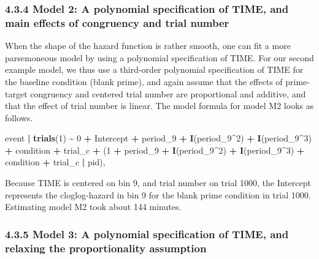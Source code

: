 \documentclass[
  man,floatsintext]{apa6}
\newenvironment{Shaded}{\begin{snugshade}}{\end{snugshade}}
\newcommand{\DecValTok}[1]{\textcolor[rgb]{0.00,0.00,0.81}{#1}}
\newcommand{\FunctionTok}[1]{\textcolor[rgb]{0.13,0.29,0.53}{\textbf{#1}}}
\newcommand{\NormalTok}[1]{#1}
\newcommand{\SpecialCharTok}[1]{\textcolor[rgb]{0.81,0.36,0.00}{\textbf{#1}}}
\begin{document}
\subsubsection{4.3.4 Model 2: A polynomial specification of TIME, and main effects of congruency and trial number}\label{model-2-a-polynomial-specification-of-time-and-main-effects-of-congruency-and-trial-number}

When the shape of the hazard function is rather smooth, one can fit a more parsemoneous model by using a polynomial specification of TIME. For our second example model, we thus use a third-order polynomial specification of TIME for the baseline condition (blank prime), and again assume that the effects of prime-target congruency and centered trial number are proportional and additive, and that the effect of trial number is linear. The model formula for model M2 looks as follows.

\scriptsize

\begin{Shaded}
\begin{Highlighting}[]
\NormalTok{event }\SpecialCharTok{|} \FunctionTok{trials}\NormalTok{(}\DecValTok{1}\NormalTok{) }\SpecialCharTok{\textasciitilde{}} \DecValTok{0} \SpecialCharTok{+}\NormalTok{ Intercept }\SpecialCharTok{+}\NormalTok{ period\_9 }\SpecialCharTok{+} \FunctionTok{I}\NormalTok{(period\_9}\SpecialCharTok{\^{}}\DecValTok{2}\NormalTok{) }\SpecialCharTok{+} \FunctionTok{I}\NormalTok{(period\_9}\SpecialCharTok{\^{}}\DecValTok{3}\NormalTok{) }\SpecialCharTok{+}
\NormalTok{                           condition }\SpecialCharTok{+}\NormalTok{ trial\_c }\SpecialCharTok{+}
\NormalTok{                           (}\DecValTok{1} \SpecialCharTok{+}\NormalTok{ period\_9 }\SpecialCharTok{+} \FunctionTok{I}\NormalTok{(period\_9}\SpecialCharTok{\^{}}\DecValTok{2}\NormalTok{) }\SpecialCharTok{+} \FunctionTok{I}\NormalTok{(period\_9}\SpecialCharTok{\^{}}\DecValTok{3}\NormalTok{) }\SpecialCharTok{+}
\NormalTok{                           condition }\SpecialCharTok{+}\NormalTok{ trial\_c }\SpecialCharTok{|}\NormalTok{ pid),}
\end{Highlighting}
\end{Shaded}

\normalsize

Because TIME is centered on bin 9, and trial number on trial 1000, the Intercept represents the cloglog-hazard in bin 9 for the blank prime condition in trial 1000. Estimating model M2 took about 144 minutes.

\subsubsection{4.3.5 Model 3: A polynomial specification of TIME, and relaxing the proportionality assumption}\label{model-3-a-polynomial-specification-of-time-and-relaxing-the-proportionality-assumption}
\end{document}
